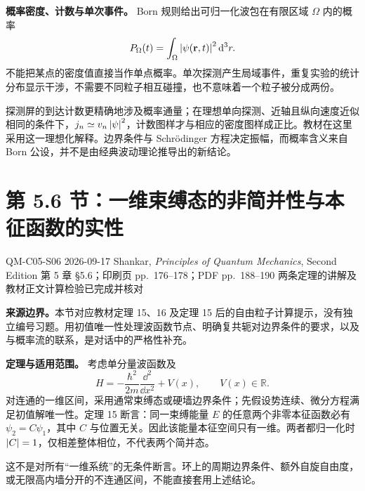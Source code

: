 \textbf{概率密度、计数与单次事件。}
Born 规则给出可归一化波包在有限区域 $\Omega$ 内的概率
\begin{equation}
  P_\Omega(t)=\int_\Omega\left|\psi(\mathbf r,t)\right|^2\mathop{}\!\mathrm{d}^3r.
\end{equation}
不能把某点的密度值直接当作单点概率。单次探测产生局域事件，重复实验的统计分布显示干涉，不需要不同粒子相互碰撞，也不意味着一个粒子被分成两份。

探测屏的到达计数更精确地涉及概率通量；在理想单向探测、近轴且纵向速度近似相同的条件下，$j_n\simeq v_n\left|\psi\right|^2$，计数图样才与相应的密度图样成正比。教材在这里采用这一理想化解释。边界条件与 Schr\"odinger 方程决定振幅，而概率含义来自 Born 公设，并不是由经典波动理论推导出的新结论。

\section{第 5.6 节：一维束缚态的非简并性与本征函数的实性}
\label{section:QM-C05-S06}

\studymeta
  {QM-C05-S06}
  {2026-09-17}
  {Shankar, \textit{Principles of Quantum Mechanics}, Second Edition}
  {第 5 章 \S 5.6；印刷页 pp.~176--178；PDF pp.~188--190}
  {两条定理的讲解及教材正文计算检验已完成并核对}

\textbf{来源边界。}本节对应教材定理 15、16 及定理 15 后的自由粒子计算提示，没有独立编号习题。用初值唯一性处理波函数节点、明确复共轭对边界条件的要求，以及与概率流的联系，是对话中的严格性补充。



\textbf{定理与适用范围。}
考虑单分量波函数及
\begin{equation}
  H=-\frac{\hbar^2}{2m}\frac{\dd^2}{\dd x^2}+V(x),
  \qquad V(x)\in\mathbb R.
  \label{eq:QM-C05-S06-hamiltonian}
\end{equation}
对连通的一维区间，采用通常束缚态或硬墙边界条件；先假设势连续、微分方程满足初值解唯一性。定理 15 断言：同一束缚能量 $E$ 的任意两个非零本征函数必有 $\psi_2=C\psi_1$，其中 $C$ 与位置无关。因此该能量本征空间只有一维。两者都归一化时 $\left|C\right|=1$，仅相差整体相位，不代表两个简并态。

这不是对所有“一维系统”的无条件断言。环上的周期边界条件、额外自旋自由度，或无限高内墙分开的不连通区间，不能直接套用上述结论。


